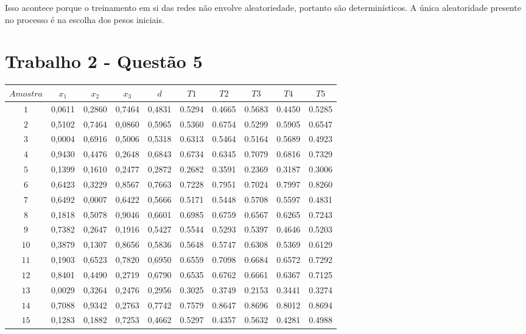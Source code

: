 \documentclass[a4paper]{article}
\begin{document}
Isso acontece porque o treinamento em si das redes n\~ao envolve aleatoriedade, portanto s\~ao determin\'isticos. A \'unica aleatoridade presente no processo \'e na escolha dos pesos iniciais.


\section*{Trabalho 2 - Quest\~ao 5}

\begin{tabular}{|c|c|c|c|c|c|c|c|c|c|}
\hline
$Amostra$ & $x_1$ & $x_2$ & $x_3$ & $d$ & $T1$ & $T2$ & $T3$ & $T4$ & $T5$ \\ \hline
$1$  & 0,0611 & 0,2860 & 0,7464 & 0,4831 & 0.5294 & 0.4665 & 0.5683 & 0.4450 & 0.5285 \\ \hline
$2$  & 0,5102 & 0,7464 & 0,0860 & 0,5965 & 0.5360 & 0.6754 & 0.5299 & 0.5905 & 0.6547 \\ \hline
$3$  & 0,0004 & 0,6916 & 0,5006 & 0,5318 & 0.6313 & 0.5464 & 0.5164 & 0.5689 & 0.4923 \\ \hline
$4$  & 0,9430 & 0,4476 & 0,2648 & 0,6843 & 0.6734 & 0.6345 & 0.7079 & 0.6816 & 0.7329 \\ \hline
$5$  & 0,1399 & 0,1610 & 0,2477 & 0,2872 & 0.2682 & 0.3591 & 0.2369 & 0.3187 & 0.3006 \\ \hline
$6$  & 0,6423 & 0,3229 & 0,8567 & 0,7663 & 0.7228 & 0.7951 & 0.7024 & 0.7997 & 0.8260 \\ \hline
$7$  & 0,6492 & 0,0007 & 0,6422 & 0,5666 & 0.5171 & 0.5448 & 0.5708 & 0.5597 & 0.4831 \\ \hline
$8$  & 0,1818 & 0,5078 & 0,9046 & 0,6601 & 0.6985 & 0.6759 & 0.6567 & 0.6265 & 0.7243 \\ \hline
$9$  & 0,7382 & 0,2647 & 0,1916 & 0,5427 & 0.5544 & 0.5293 & 0.5397 & 0.4646 & 0.5203 \\ \hline
$10$ & 0,3879 & 0,1307 & 0,8656 & 0,5836 & 0.5648 & 0.5747 & 0.6308 & 0.5369 & 0.6129 \\ \hline
$11$ & 0,1903 & 0,6523 & 0,7820 & 0,6950 & 0.6559 & 0.7098 & 0.6684 & 0.6572 & 0.7292 \\ \hline
$12$ & 0,8401 & 0,4490 & 0,2719 & 0,6790 & 0.6535 & 0.6762 & 0.6661 & 0.6367 & 0.7125 \\ \hline
$13$ & 0,0029 & 0,3264 & 0,2476 & 0,2956 & 0.3025 & 0.3749 & 0.2153 & 0.3441 & 0.3274 \\ \hline
$14$ & 0,7088 & 0,9342 & 0,2763 & 0,7742 & 0.7579 & 0.8647 & 0.8696 & 0.8012 & 0.8694 \\ \hline
$15$ & 0,1283 & 0,1882 & 0,7253 & 0,4662 & 0.5297 & 0.4357 & 0.5632 & 0.4281 & 0.4988 \\ \hline

\end{tabular}
\end{document}

